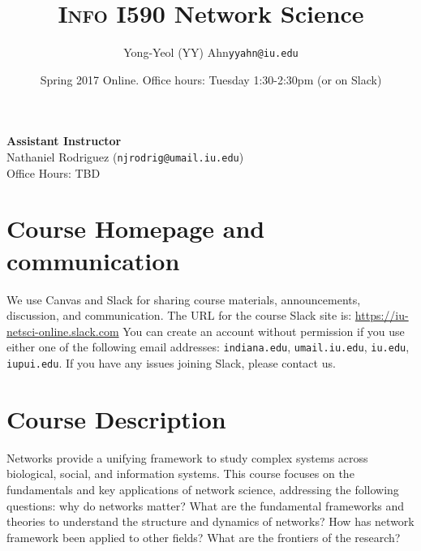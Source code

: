 \documentclass[11pt,article,oneside]{memoir}
\makeatletter
\def\myauthor{Author}
\def\mytitle{Title}
\def\myemail{yyahn@iu.edu}
\def\myauthor{Yong-Yeol (YY) Ahn}
\def\mytitle{{\normalsize \textsc{Info} I590 \newline} \HUGE Network Science}
\makeatother
\begin{document}

\def\ind{\hangindent=1 true cm\hangafter=1 \noindent}
\def\labelitemi{$\cdot$}


\title{\LARGE \mytitle}     
\author{\Large\myauthor \newline \footnotesize\texttt{\noindent\myemail}}
\date{Spring 2017 Online. %
\newline Office hours: Tuesday 1:30-2:30pm (or on Slack)}

\maketitle

\vspace{-20pt}
{\bfseries Assistant Instructor} \\ Nathaniel Rodriguez (\texttt{njrodrig@umail.iu.edu}) \\ Office Hours: TBD

\section{Course Homepage and communication}

We use Canvas and Slack for sharing course materials, announcements,
discussion, and communication. The URL for the course Slack site is:
\url{https://iu-netsci-online.slack.com} You can create an account without
permission if you use either one of the following email addresses:
\texttt{indiana.edu}, \texttt{umail.iu.edu}, \texttt{iu.edu},
\texttt{iupui.edu}. If you have any issues joining Slack, please contact us. 


\section{Course Description}

Networks provide a unifying framework to study complex systems across
biological, social, and information systems. This course focuses on the
fundamentals and key applications of network science, addressing the following
questions: why do networks matter? What are the fundamental frameworks and
theories to understand the structure and dynamics of networks?  How has network
framework been applied to other fields? What are the frontiers of the research?
\end{document}
